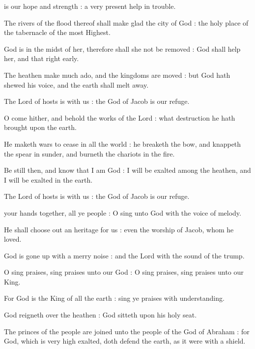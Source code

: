
 is our hope and strength : a very present help in trouble.\par
{}
The rivers of the flood thereof shall make glad the city of God : the holy place of the tabernacle of the most Highest.\par
{}God is in the midst of her, therefore shall she not be removed : God shall help her, and that right early.\par
{}The heathen make much ado, and the kingdoms are moved : but God hath shewed his voice, and the earth shall melt away.\par
{}The Lord of hosts is with us : the God of Jacob is our refuge.\par
{}O come hither, and behold the works of the Lord : what destruction he hath brought upon the earth.\par
{}He maketh wars to cease in all the world : he breaketh the bow, and knappeth the spear in sunder, and burneth the chariots in the fire.\par
{}Be still then, and know that I am God : I will be exalted among the heathen, and I will be exalted in the earth.\par
{}The Lord of hosts is with us : the God of Jacob is our refuge.\par



 your hands together, all ye people : O sing unto God with the voice of melody.\par
{}
He shall choose out an heritage for us : even the worship of Jacob, whom he loved.\par
{}God is gone up with a merry noise : and the Lord with the sound of the trump.\par
{}O sing praises, sing praises unto our God : O sing praises, sing praises unto our King.\par
{}For God is the King of all the earth : sing ye praises with understanding.\par
{}God reigneth over the heathen : God sitteth upon his holy seat.\par
{}The princes of the people are joined unto the people of the God of Abraham : for God, which is very high exalted, doth defend the earth, as it were with a shield.\par

